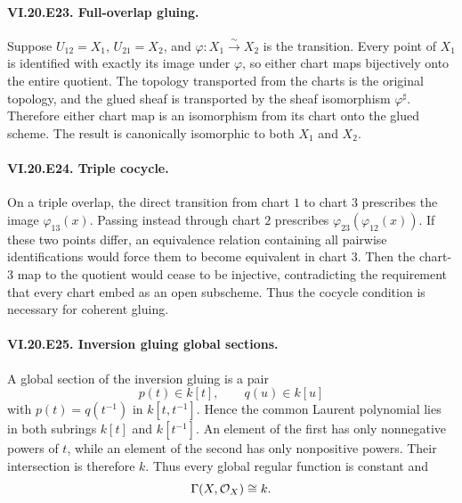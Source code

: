 \paragraph{VI.20.E23. Full-overlap gluing.}
\begin{solution}
Suppose $U_{12}=X_1$, $U_{21}=X_2$, and $\varphi:X_1\xrightarrow{\sim}X_2$ is the transition.  Every point of $X_1$ is identified with exactly its image under $\varphi$, so either chart maps bijectively onto the entire quotient.  The topology transported from the charts is the original topology, and the glued sheaf is transported by the sheaf isomorphism $\varphi^\sharp$.  Therefore either chart map is an isomorphism from its chart onto the glued scheme.  The result is canonically isomorphic to both $X_1$ and $X_2$.
\end{solution}

\paragraph{VI.20.E24. Triple cocycle.}
\begin{solution}
On a triple overlap, the direct transition from chart $1$ to chart $3$ prescribes the image $\varphi_{13}(x)$.  Passing instead through chart $2$ prescribes $\varphi_{23}(\varphi_{12}(x))$.  If these two points differ, an equivalence relation containing all pairwise identifications would force them to become equivalent in chart $3$.  Then the chart-$3$ map to the quotient would cease to be injective, contradicting the requirement that every chart embed as an open subscheme.  Thus the cocycle condition is necessary for coherent gluing.
\end{solution}

\paragraph{VI.20.E25. Inversion gluing global sections.}
\begin{solution}
A global section of the inversion gluing is a pair
\[
p(t)\in k[t],\qquad q(u)\in k[u]
\]
with $p(t)=q(t^{-1})$ in $k[t,t^{-1}]$.  Hence the common Laurent polynomial lies in both subrings $k[t]$ and $k[t^{-1}]$.  An element of the first has only nonnegative powers of $t$, while an element of the second has only nonpositive powers.  Their intersection is therefore $k$.  Thus every global regular function is constant and
\[
\Gamma(X,\mathcal O_X)\cong k.
\]
\end{solution}

